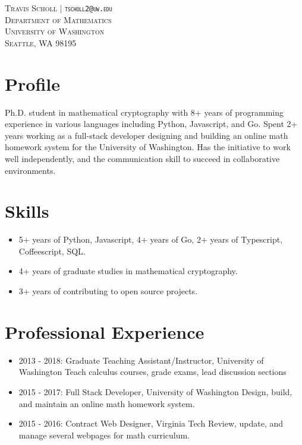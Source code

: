 \documentclass{article}
\begin{document}
	
	\vspace*{-1.25in}
	
	\begin{center}
	\textsc{
		Travis Scholl $\vert$ {\tt tscholl2@uw.edu} \\
		Department of Mathematics \\
		University of Washington \\
		Seattle, WA 98195
	}
	\end{center}
	
	\section{Profile}
	
	Ph.D. student in mathematical cryptography with 8+ years of programming experience in various languages including Python, Javascript, and Go. Spent 2+ years working as a full-stack developer designing and building an online math homework system for the University of Washington. Has the initiative to work well independently, and the communication skill to succeed in collaborative environments.
	
	\section{Skills}
	
	\begin{itemize} 
		\item 5+ years of Python, Javascript, 4+ years of Go, 2+ years of Typescript, Coffeescript, SQL.
		\item 4+ years of graduate studies in mathematical cryptography.
		\item 3+ years of contributing to open source projects.
	\end{itemize}

	\section{Professional Experience}
	
	\begin{itemize}  
		\item 2013 - 2018: Graduate Teaching Assistant/Instructor, University of Washington
			\subitem Teach calculus courses, grade exams, lead discussion sections
		\item 2015 - 2017: Full Stack Developer, University of Washington
			\subitem Design, build, and maintain an online math homework system.
		\item 2015 - 2016: Contract Web Designer, Virginia Tech
			\subitem Review, update, and manage several webpages for math curriculum.
	\end{itemize}
	
\end{document}
